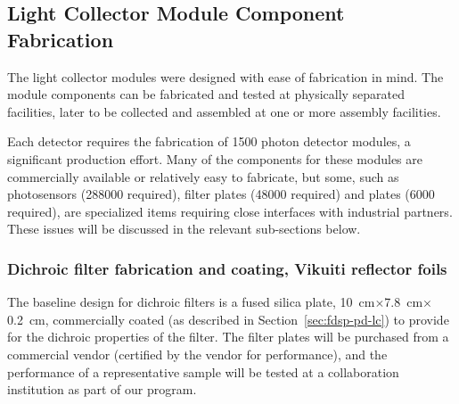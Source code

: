 
\subsection{Light Collector Module Component Fabrication}

The  light collector modules were designed with ease of fabrication in mind.  The module components can be fabricated and  tested at physically separated facilities, later to be collected and assembled at one or more assembly facilities.  %


Each  detector requires the fabrication of \num{1500} photon detector modules, a significant production effort.  Many of the components for these modules are commercially available or relatively easy to fabricate, but some, such as photosensors (\num{288000} required), filter plates (\num{48000} required) and  plates (\num{6000} required), are specialized items requiring close interfaces with industrial partners.  These issues will be discussed in the relevant sub-sections below.   

\subsubsection{Dichroic filter fabrication and coating, Vikuiti reflector foils}


The baseline design for dichroic filters is 
a fused silica plate,  \SI{10}{cm}$\times$\SI{7.8}{cm}$\times$\SI{0.2}{cm}, commercially coated (as described in Section~\ref{sec:fdsp-pd-lc}) to provide for the dichroic properties of the filter.  
The filter plates will be purchased from a commercial vendor (certified by the vendor for performance), and the performance of a representative sample will be tested at a collaboration institution as part of our  program.  

